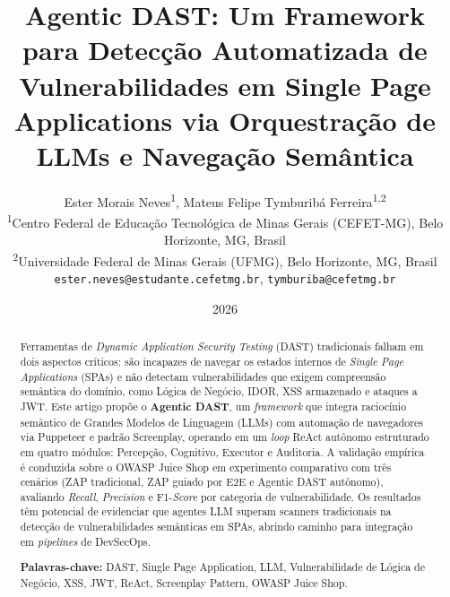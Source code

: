 \documentclass[
    10pt,
    twocolumn,
    a4paper
]{article}
\title{
    \textbf{Agentic DAST: Um Framework para Detecção Automatizada
    de Vulnerabilidades em Single Page Applications
    via Orquestração de LLMs e Navegação Semântica}
}
\author{
    Ester Morais Neves\textsuperscript{1},
    Mateus Felipe Tymburibá Ferreira\textsuperscript{1,2}\\
    \small\textsuperscript{1}Centro Federal de Educação Tecnológica de
    Minas Gerais (CEFET-MG), Belo Horizonte, MG, Brasil\\
    \small\textsuperscript{2}Universidade Federal de Minas Gerais (UFMG),
    Belo Horizonte, MG, Brasil\\
    \small\texttt{ester.neves@estudante.cefetmg.br},
    \texttt{tymburiba@cefetmg.br}
}
\date{2026}
\begin{document}

\maketitle
\thispagestyle{empty}


\begin{abstract}
Ferramentas de \textit{Dynamic Application Security Testing} (DAST)
tradicionais falham em dois aspectos críticos: são incapazes de navegar
os estados internos de \textit{Single Page Applications} (SPAs) e não
detectam vulnerabilidades que exigem compreensão semântica do domínio,
como Lógica de Negócio, IDOR, XSS armazenado e ataques a JWT.
Este artigo propõe o \textbf{Agentic DAST}, um \textit{framework}
que integra raciocínio semântico de Grandes Modelos de Linguagem (LLMs)
com automação de navegadores via Puppeteer e padrão Screenplay, operando
em um \textit{loop} ReAct autônomo estruturado em quatro módulos:
Percepção, Cognitivo, Executor e Auditoria.
A validação empírica é conduzida sobre o OWASP Juice Shop em experimento
comparativo com três cenários (ZAP tradicional, ZAP guiado por E2E e
Agentic DAST autônomo), avaliando \textit{Recall}, \textit{Precision} e
F1-\textit{Score} por categoria de vulnerabilidade.
Os resultados têm potencial de evidenciar que agentes LLM superam
scanners tradicionais na detecção de vulnerabilidades semânticas em SPAs,
abrindo caminho para integração em \textit{pipelines} de DevSecOps.

\bigskip\noindent
\textbf{Palavras-chave:}
DAST, Single Page Application, LLM, Vulnerabilidade de Lógica de Negócio,
XSS, JWT, ReAct, Screenplay Pattern, OWASP Juice Shop.
\end{abstract}
\end{document}
